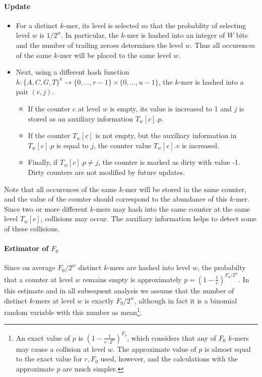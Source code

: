 \paragraph{Update}
\begin{itemize}
\item For a distinct $k$-mer, its level is selected so that the probablity of selecting 
level $w$ is $1/2^w$. In particular, the $k$-mer is hashed into an integer of $W$ bits 
and the number of trailing zeroes determines the level $w$. Thus all occurences of the same
$k$-mer will be placed to the same level $w$.

\item Next, using a different hash function
$h: \{A, C, G, T\}^k \rightarrow \{ 0, \dots, r-1\} \times \{ 0, \dots, u-1\}$, 
the $k$-mer is hashed into a pair $(c, j)$. 
\begin{itemize}
\item If the counter $c$ at level $w$ is empty, its value is increased to 1 and $j$
is stored as an auxiliary information  $T_w[c].p$.
\item If the counter $T_w[c]$ is not empty, but the auxiliary information in $T_w[c].p$ 
is equal to $j$, the counter value $T_w[c].v$ is increased.
\item Finally, if $T_w[c].p \neq j$, the counter is marked as dirty with value -1.
Dirty counters are not modified by future updates.
\end{itemize}
\end{itemize}
Note that all occurences of the same $k$-mer will be stored in the same counter, 
and the value of the counter should correspond to the abundance of this $k$-mer.
Since two or more different $k$-mers may hash into the same counter at the same
level $T_w[c]$, collisions may occur. The auxiliary information helps to detect
some of these collisions.


\paragraph{Estimator of $F_0$}
Since on average $F_0 / 2^w$ distinct $k$-mers are hashed into level $w$, the probabilty
that a counter at level $w$ remains empty is approximately $p = (1 - \frac{1}{r})^{F_0/2^w}$.
In this estimate and in all subsequent analysis we assume that the number of distinct $k$-mers
at level $w$ is exactly $F_0/2^w$, although in fact it is a binomial random variable with
this number as mean\footnote{An exact value of $p$ is $(1 - \frac{1}{r \cdot 2^w})^{F_0}$,
which considers that any of $F_0$ $k$-mers may cause a collision at level $w$.
The approximate value of $p$ is almost equal to the exact value for $r, F_0$ used, however,
and the calculations with the approximate $p$ are much simpler.}.

